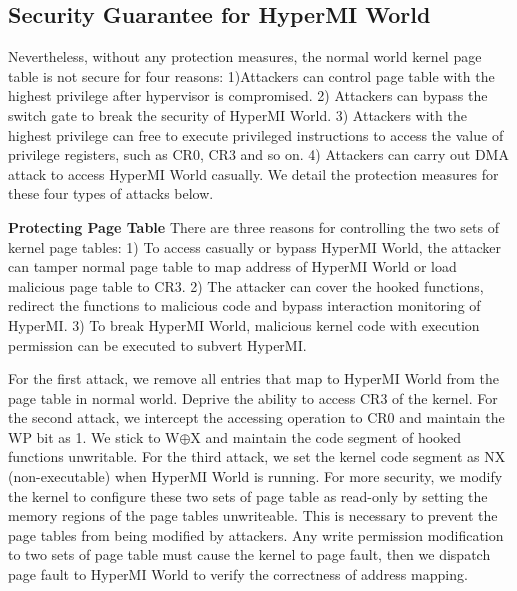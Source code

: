 \documentclass[conference]{IEEEtran}
\begin{document}
\subsection{Security Guarantee for HyperMI World}\label {SG}
Nevertheless, without any protection measures, the normal world kernel page table is not secure for four reasons: 1)Attackers can control page table with the highest privilege after hypervisor is compromised. 2) Attackers can bypass the switch gate to break the security of HyperMI World. 3) Attackers with the highest privilege can free to execute privileged instructions to access the value of privilege registers, such as CR0, CR3 and so on. 4) Attackers can carry out DMA attack to access HyperMI World casually.
We detail the protection measures for these four types of attacks below.



\textbf{Protecting Page Table}
There are three reasons for controlling the two sets of kernel page tables: 1) To access casually or bypass HyperMI World, the attacker can tamper normal page table to map address of HyperMI World or load malicious page table to CR3.
2) The attacker can cover the hooked functions, redirect the functions to malicious code and bypass interaction monitoring of HyperMI. 3) To break HyperMI World, malicious kernel code with execution permission can be executed to subvert HyperMI.

For the first attack, %
we remove all entries that map to HyperMI World from the page table in normal world. Deprive the ability to access CR3 of the kernel. %
For the second attack, we intercept the accessing operation to CR0 and maintain the WP bit as 1. We stick to W$\oplus${X} and maintain the code segment of hooked functions unwritable.
For the third attack, we set the kernel code segment as NX (non-executable) when HyperMI World is running. For more security, we modify the kernel to configure these two sets of page table as read-only by setting the memory regions of the page tables unwriteable. This is necessary to prevent the page tables from being modified by attackers. Any write permission modification to two sets of page table must cause the kernel to page fault, then we dispatch page fault to HyperMI World to verify the correctness of address mapping. 
\end{document}
